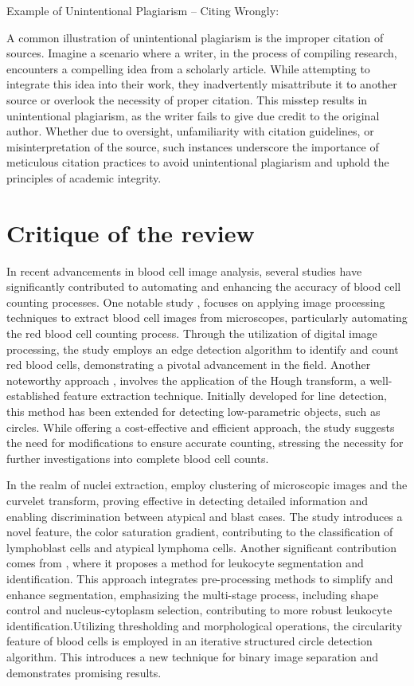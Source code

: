 Example of Unintentional Plagiarism – Citing Wrongly:

A common illustration of unintentional plagiarism is the improper citation of sources. Imagine a scenario where a writer, in the process of compiling research, encounters a compelling idea from a scholarly article. While attempting to integrate this idea into their work, they inadvertently misattribute it to another source or overlook the necessity of proper citation. This misstep results in unintentional plagiarism, as the writer fails to give due credit to the original author. Whether due to oversight, unfamiliarity with citation guidelines, or misinterpretation of the source, such instances underscore the importance of meticulous citation practices to avoid unintentional plagiarism and uphold the principles of academic integrity.



\section{Critique of the review} %
In recent advancements in blood cell image analysis, several studies have significantly contributed to automating and enhancing the accuracy of blood cell counting processes. One notable study \cite{alomari2014automatic}, focuses on applying image processing techniques to extract blood cell images from microscopes, particularly automating the red blood cell counting process. Through the utilization of digital image processing, the study employs an edge detection algorithm to identify and count red blood cells, demonstrating a pivotal advancement in the field. Another noteworthy approach \cite{maitra2012detection}, involves the application of the Hough transform, a well-established feature extraction technique. Initially developed for line detection, this method has been extended for detecting low-parametric objects, such as circles. While offering a cost-effective and efficient approach, the study suggests the need for modifications to ensure accurate counting, stressing the necessity for further investigations into complete blood cell counts.

In the realm of nuclei extraction, \cite{poomcokrak2008red} employ clustering of microscopic images and the curvelet transform, proving effective in detecting detailed information and enabling discrimination between atypical and blast cases. The study introduces a novel feature, the color saturation gradient, contributing to the classification of lymphoblast cells and atypical lymphoma cells. Another significant contribution comes from \cite{putzu2013white}, where it proposes a method for leukocyte segmentation and identification. This approach integrates pre-processing methods to simplify and enhance segmentation, emphasizing the multi-stage process, including shape control and nucleus-cytoplasm selection, contributing to more robust leukocyte identification.Utilizing thresholding and morphological operations, the circularity feature \cite{sarrafzadeh2015circlet} of blood cells is employed in an iterative structured circle detection algorithm. This introduces a new technique for binary image separation and demonstrates promising results.


